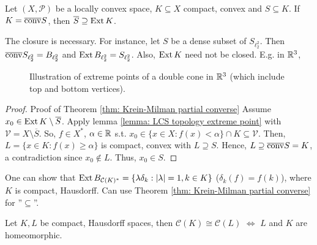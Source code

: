\documentclass{article}
\begin{document}
\begin{theorem}\label{thm: Krein-Milman partial converse}
    Let $(X, \mathcal{P})$ be a locally convex space, $K\subseteq X$ compact, convex and $S\subseteq K$. If $K = \overline{\operatorname{conv}}S$, then $\overline{S}\supseteq \operatorname{Ext} K$.
\end{theorem}

\begin{remark}
    The closure is necessary. For instance, let $S$ be a dense subset of $S_{\ell_2^2}$. Then $\overline{\operatorname{conv}}S_{\ell_2^2} = B_{\ell_2^2}$ and $\operatorname{Ext} B_{\ell_2^2}= S_{\ell_2^2}$. Also, $\operatorname{Ext} K$ need not be closed. E.g. in $\mathbb{R}^3$,
    \begin{figure}[H]
    \centering
    
    \caption{Illustration of extreme points of a double cone in $\mathbb{R}^3$ (which include top and bottom vertices).}
    \label{fig: extreme points}
\end{figure}
\end{remark}

\begin{proof}{Proof of Theorem \ref{thm: Krein-Milman partial converse}}
    Assume $x_0\in \operatorname{Ext} K\setminus \overline{S}$. Apply lemma \ref{lemma: LCS topology extreme point} with $\mathcal{V}=X\setminus\overline{S}$. So, $f\in X^*$, $\alpha\in \mathbb{R}$ s.t. $x_0\in \{x\in X: f(x)<\alpha\}\cap K\subseteq \mathcal{V}$. Then, $L = \{x\in K: f(x)\geq \alpha\}$ is compact, convex with $L\supseteq S$. Hence, $L\supseteq \overline{\operatorname{conv}} S = K$, a contradiction since $x_0\not\in L$. Thus, $x_0\in S$. 
\end{proof}

\begin{remark}
    One can show that $\operatorname{Ext} B_{\mathcal{C}(K)^*}=\{\lambda \delta_k: |\lambda|=1, k\in K\}$ ($\delta_k(f)=f(k)$), where $K$ is compact, Hausdorff. Can use Theorem \ref{thm: Krein-Milman partial converse} for ''$\subseteq$''.
\end{remark}

\begin{theorem}\label{thm: Banach-Stone}
    Let $K,L$ be compact, Hausdorff spaces, then $\mathcal{C}(K)\cong \mathcal{C}(L)$ $\iff$ $L$ and $K$ are homeomorphic. 
\end{theorem}
\end{document}
